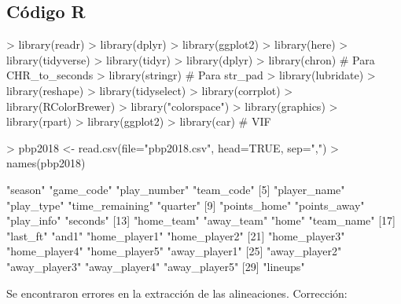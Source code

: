 \documentclass[paper=a4, fontsize=9pt]{article}
\begin{document}
\clearpage

\subsection{Código R} \label{sec:Annexo2}

\begin{Schunk}
\begin{Sinput}
> library(readr)
> library(dplyr)
> library(ggplot2)
> library(here)
> library(tidyverse)
> library(tidyr)
> library(dplyr)
> library(chron)                 # Para CHR_to_seconds
> library(stringr)               # Para str_pad
> library(lubridate)
> library(reshape)
> library(tidyselect)
> library(corrplot)
> library(RColorBrewer)
> library("colorspace")
> library(graphics)
> library(rpart)
> library(ggplot2)
> library(car)                   # VIF
\end{Sinput}
\end{Schunk}

\begin{Schunk}
\begin{Sinput}
> pbp2018 <- read.csv(file="pbp2018.csv", head=TRUE, sep=",")
> names(pbp2018)
\end{Sinput}
\begin{Soutput}
 [1] "season"         "game_code"      "play_number"    "team_code"     
 [5] "player_name"    "play_type"      "time_remaining" "quarter"       
 [9] "points_home"    "points_away"    "play_info"      "seconds"       
[13] "home_team"      "away_team"      "home"           "team_name"     
[17] "last_ft"        "and1"           "home_player1"   "home_player2"  
[21] "home_player3"   "home_player4"   "home_player5"   "away_player1"  
[25] "away_player2"   "away_player3"   "away_player4"   "away_player5"  
[29] "lineups"       
\end{Soutput}
\end{Schunk}

Se encontraron errores en la extracción de las alineaciones. Corrección:
\end{document}
